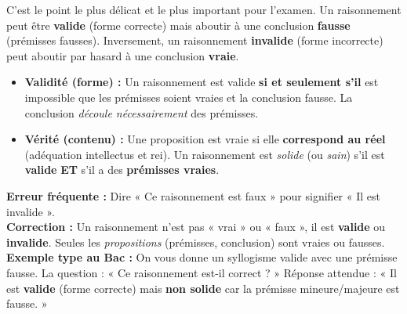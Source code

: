 \documentclass[11pt]{article}
\begin{document}
C'est le point le plus délicat et le plus important pour l'examen. Un raisonnement peut être \textbf{valide} (forme correcte) mais aboutir à une conclusion \textbf{fausse} (prémisses fausses). Inversement, un raisonnement \textbf{invalide} (forme incorrecte) peut aboutir par hasard à une conclusion \textbf{vraie}.

\begin{propriete}
\begin{itemize}
    \item \textbf{Validité (forme) :} Un raisonnement est valide \textbf{si et seulement s'il} est impossible que les prémisses soient vraies et la conclusion fausse. La conclusion \emph{découle nécessairement} des prémisses.
    \item \textbf{Vérité (contenu) :} Une proposition est vraie si elle \textbf{correspond au réel} (adéquation intellectus et rei). Un raisonnement est \emph{solide} (ou \emph{sain}) s'il est \textbf{valide} \textbf{ET} s'il a des \textbf{prémisses vraies}.
\end{itemize}
\end{propriete}

\begin{attention}
\textbf{Erreur fréquente :} Dire « Ce raisonnement est faux » pour signifier « Il est invalide ».\\
\textbf{Correction :} Un raisonnement n'est pas « vrai » ou « faux », il est \textbf{valide} ou \textbf{invalide}. Seules les \emph{propositions} (prémisses, conclusion) sont vraies ou fausses.\\
\textbf{Exemple type au Bac :} On vous donne un syllogisme valide avec une prémisse fausse. La question : « Ce raisonnement est-il correct ? » Réponse attendue : « Il est \textbf{valide} (forme correcte) mais \textbf{non solide} car la prémisse mineure/majeure est fausse. »
\end{attention}
\end{document}
